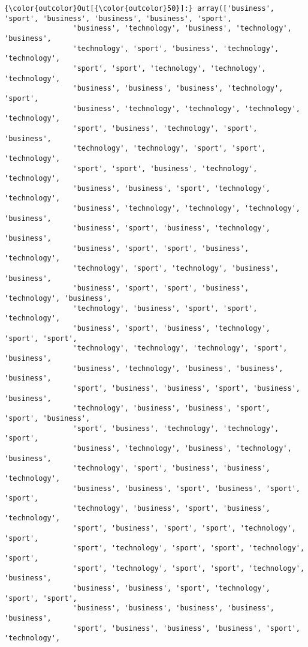 \documentclass[11pt]{article}
\begin{document}
\begin{Verbatim}[commandchars=\\\{\}]
{\color{outcolor}Out[{\color{outcolor}50}]:} array(['business', 'sport', 'business', 'business', 'business', 'sport',
                'business', 'technology', 'business', 'technology', 'business',
                'technology', 'sport', 'business', 'technology', 'technology',
                'sport', 'sport', 'technology', 'technology', 'technology',
                'business', 'business', 'business', 'technology', 'sport',
                'business', 'technology', 'technology', 'technology', 'technology',
                'sport', 'business', 'technology', 'sport', 'business',
                'technology', 'technology', 'sport', 'sport', 'technology',
                'sport', 'sport', 'business', 'technology', 'technology',
                'business', 'business', 'sport', 'technology', 'technology',
                'business', 'technology', 'technology', 'technology', 'business',
                'business', 'sport', 'business', 'technology', 'business',
                'business', 'sport', 'sport', 'business', 'technology',
                'technology', 'sport', 'technology', 'business', 'business',
                'business', 'sport', 'sport', 'business', 'technology', 'business',
                'technology', 'business', 'sport', 'sport', 'technology',
                'business', 'sport', 'business', 'technology', 'sport', 'sport',
                'technology', 'technology', 'technology', 'sport', 'business',
                'business', 'technology', 'business', 'business', 'business',
                'sport', 'business', 'business', 'sport', 'business', 'business',
                'technology', 'business', 'business', 'sport', 'sport', 'business',
                'sport', 'business', 'technology', 'technology', 'sport',
                'business', 'technology', 'business', 'technology', 'business',
                'technology', 'sport', 'business', 'business', 'technology',
                'business', 'business', 'sport', 'business', 'sport', 'sport',
                'technology', 'business', 'sport', 'business', 'technology',
                'sport', 'business', 'sport', 'sport', 'technology', 'sport',
                'sport', 'technology', 'sport', 'sport', 'technology', 'sport',
                'sport', 'technology', 'sport', 'sport', 'technology', 'business',
                'business', 'business', 'sport', 'technology', 'sport', 'sport',
                'business', 'business', 'business', 'business', 'business',
                'sport', 'business', 'business', 'business', 'sport', 'technology',

\end{Verbatim}
\end{document}
